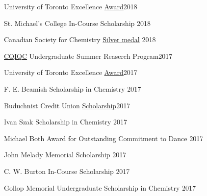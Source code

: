 \documentclass[margin,line]{res}
\begin{document}
\begin{resume}
\vspace*{-3mm}

University of Toronto Excellence \href{https://registrar.utoronto.ca/finances-and-funding/utea/}{Award}\hfill{2018}

\vspace*{-3mm}

St. Michael's College In-Course Scholarship \hfill {2018}

\vspace*{-3mm}

Canadian Society for Chemistry \href{https://www.cheminst.ca/awards/student/} {Silver medal} \hfill{2018} 

\vspace*{-3mm}

\href{https://cqiqc.physics.utoronto.ca/cqiqc-programs/undergraduates/}{CQIQC} Undergraduate Summer Reaserch Program\hfill{2017}

\vspace*{-3mm}

University of Toronto Excellence \href{https://registrar.utoronto.ca/finances-and-funding/utea/}{Award}\hfill{2017}

\vspace*{-3mm}

F. E. Beamish Scholarship in Chemistry \hfill{2017}

\vspace*{-3mm}

Buduchnist Credit Union \href{http://www.buduchnist.com/scholarships}{Scholarship}\hfill {2017}

\vspace*{-3mm}

Ivan Szak Scholarship in Chemistry \hfill {2017}

\vspace*{-3mm}

Michael Both Award for Outstanding Commitment to Dance %
\hfill {2017}

\vspace*{-3mm}

John Melady Memorial Scholarship \hfill{2017} 

\vspace*{-3mm}

C. W. Burton In-Course Scholarship \hfill{2017} 

\vspace*{-3mm}

Gollop Memorial Undergraduate Scholarship in Chemistry \hfill{2017}


\end{resume}
\end{document}
